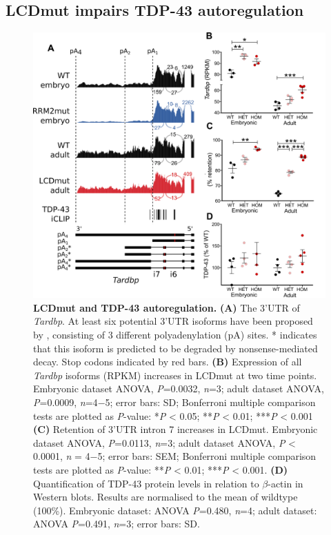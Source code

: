 \subsection{LCDmut impairs TDP-43 autoregulation}

\begin{figure}[h!]
	\centering
	\includegraphics[width=\textwidth]{Figures/05_tdp_mice/autoregulation.png}
	\caption[LCDmut and TDP-43 autoregulation]{
		\textbf{LCDmut and TDP-43 autoregulation.}
	\textbf{(A)} The 3'UTR of \textit{Tardbp}. At least six potential 3'UTR isoforms have been proposed by \citep{Koyama2016}, consisting of 3 different polyadenylation (pA) sites. * indicates that this isoform is predicted to be degraded by nonsense-mediated decay. Stop codons indicated by red bars. 
	\textbf{(B)} Expression of all \textit{Tardbp} isoforms (RPKM) increases in LCDmut at two time points.  Embryonic dataset ANOVA, \textit{P}=0.0032, \textit{n}=3; adult dataset ANOVA, \textit{P}=0.0009, \textit{n}=4$-$5; error bars: SD; Bonferroni multiple comparison tests are plotted as \textit{P}-value: *\textit{P} < 0.05; **\textit{P} < 0.01; ***\textit{P} < 0.001
	\textbf{(C)} Retention of 3'UTR intron 7 increases in LCDmut. Embryonic dataset ANOVA, \textit{P}=0.0113, \textit{n}=3; adult dataset ANOVA, \textit{P} < 0.0001, \textit{n} = 4$-$5; error bars: SEM; Bonferroni multiple comparison tests are plotted as \textit{P}-value: **\textit{P} < 0.01; ***\textit{P} < 0.001.
	\textbf{(D)} Quantification of TDP-43 protein levels in relation to $\beta$-actin in Western blots. Results are normalised to the mean of wildtype (100\%). Embryonic dataset: ANOVA \textit{P}=0.480, \textit{n}=4; adult dataset: ANOVA \textit{P}=0.491, \textit{n}=3; error bars: SD.
}
	\label{fig:autoregulation}
\end{figure}

